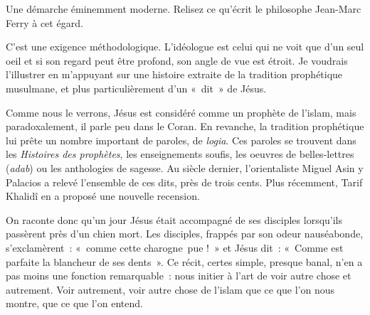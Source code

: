 Une démarche éminemment moderne. Relisez ce qu'écrit le philosophe
Jean-Marc Ferry à cet égard.


C'est une exigence méthodologique. L'idéologue est celui qui ne voit que
d'un seul  oeil et si son regard peut être profond, son angle de vue est
étroit. Je voudrais l'illustrer en m'appuyant sur une histoire extraite
de la tradition prophétique musulmane, et plus particulièrement d'un
«~dit~» de Jésus.

Comme nous le verrons, Jésus est considéré comme un prophète de l'islam,
mais paradoxalement, il parle peu dans le Coran. En revanche, la
tradition prophétique lui prête un nombre important de paroles, de
\emph{logia}. Ces paroles se trouvent dans les \emph{Histoires des
prophètes}, les enseignements soufis, les  oeuvres de belles-lettres
(\emph{adab}) ou les anthologies de sagesse. Au siècle dernier,
l'orientaliste Miguel Asin y Palacios a relevé l'ensemble de ces dits,
près de trois cents. Plus récemment, Tarif Khalidî en a proposé une
nouvelle recension.

On raconte donc qu'un jour Jésus était accompagné de ses disciples
lorsqu'ils passèrent près d'un chien mort. Les disciples, frappés
par son odeur nauséabonde, s'exclamèrent~: «~comme cette charogne~pue
!~» et Jésus dit~: «~Comme est parfaite la blancheur de ses dents~». Ce
récit, certes simple, presque banal, n'en a pas moins une fonction
remarquable~: nous initier à l'art de voir autre chose et autrement.
Voir autrement, voir autre chose de l'islam que ce que l'on nous montre,
que ce que l'on entend.

